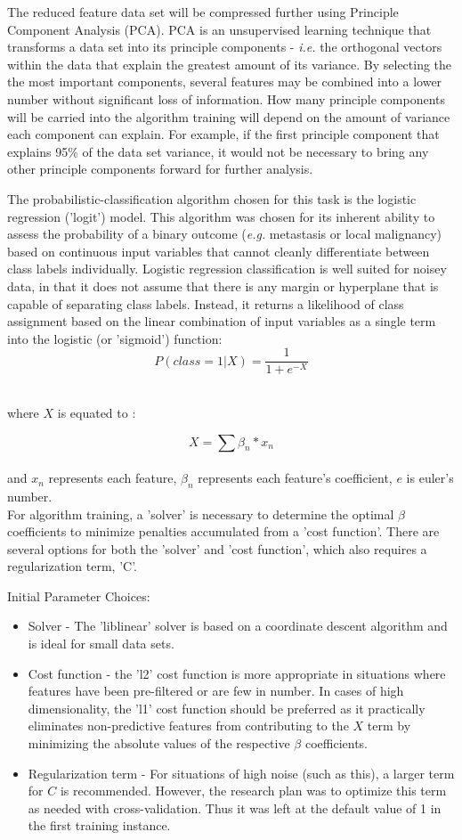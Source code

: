 \documentclass[final]{article}
\begin{document}
The reduced feature data set will be compressed further using Principle Component
Analysis (PCA).  PCA is an unsupervised learning technique that transforms a
data set into its principle components - \textit{i.e.} the orthogonal vectors within the
data that explain the greatest amount of its variance.  By selecting the
the most important components, several features may be combined into a lower
number without significant loss of information.  How many principle components
will be carried into the algorithm training will depend on the amount of variance
each component can explain.  For example, if the first principle component that
explains 95\% of the data set variance, it would not be necessary to bring any other
principle components forward for further analysis.

The probabilistic-classification algorithm chosen for this task is the logistic
regression ('logit') model.  This algorithm was chosen for its inherent ability
to assess the probability of a binary outcome (\textit{e.g.} metastasis or local
malignancy) based on continuous input variables that cannot cleanly differentiate between
class labels individually.  Logistic regression classification is well suited
for noisey data, in that it does not assume that there is any margin or hyperplane that
is capable of separating class labels.  Instead, it returns a likelihood of class assignment
based on the linear combination of input variables as a single term into the logistic (or 'sigmoid')
function:
\\
$$ P(class = 1 | X) = \frac{1}{1+e^{-X}}$$

\\
where $X$ is equated to :

$$ X = \sum{ \beta_{n}*x_{n}} $$
\\
and $x_{n}$ represents each feature, $\beta_{n}$ represents each feature's coefficient, $e$ is
euler's number.
\\
For algorithm training, a 'solver' is necessary to determine the optimal $\beta$
coefficients to minimize penalties accumulated from a 'cost function'.  There are
several options for both the 'solver' and 'cost function', which also requires
a regularization term, 'C'.

Initial Parameter Choices:
\begin{itemize}
  \item Solver - The 'liblinear' solver is based on a coordinate descent algorithm and
  is ideal for small data sets.
  \item Cost function - the 'l2' cost function is more appropriate in situations
  where features have been pre-filtered or are few in number.  In cases of high
  dimensionality, the 'l1' cost function should be preferred as it practically eliminates
  non-predictive features from contributing to the $X$ term by minimizing the absolute
  values of the respective $\beta$ coefficients.
  \item Regularization term - For situations of high noise (such as this), a larger term
  for $C$ is recommended.  However, the research plan was to optimize this term as needed with
  cross-validation.  Thus it was left at the default value of 1 in the first training instance.
\end{itemize}
\end{document}
